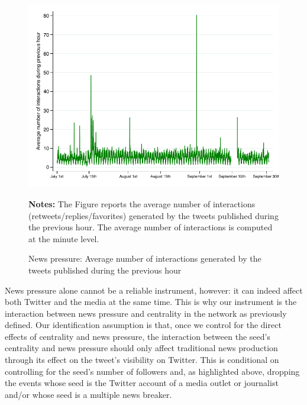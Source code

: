 \begin{figure}
\begin{center}
\includegraphics[scale=1]{figures/news_pressure_hour_illustration}
\end{center}
	\begin{spacing}{0.5}
		{\footnotesize \textbf{Notes:} The Figure reports the average number of interactions (retweets/replies/favorites) generated by the tweets published during the previous hour. The average number of interactions is computed at the minute level.}
	\end{spacing}
\vspace{.5cm}	
	\caption{News pressure: Average number of interactions generated by the tweets published during the previous hour}
	\label{fig:news_pressure_hour_illustration}
\end{figure}

 
News pressure alone cannot be a reliable instrument, however: it can indeed affect both Twitter and the media at the same time. This is why our instrument is the interaction between news pressure and centrality in the network as previously defined. Our identification assumption is that, once we control for the direct effects of centrality and news pressure, the interaction between the seed's centrality and news pressure should only affect traditional news production through its effect on the tweet's visibility on Twitter. This is conditional on controlling for the seed's number of followers and, as highlighted above, dropping the events whose seed is the Twitter account of a media outlet or journalist and/or whose seed is a multiple news breaker.



